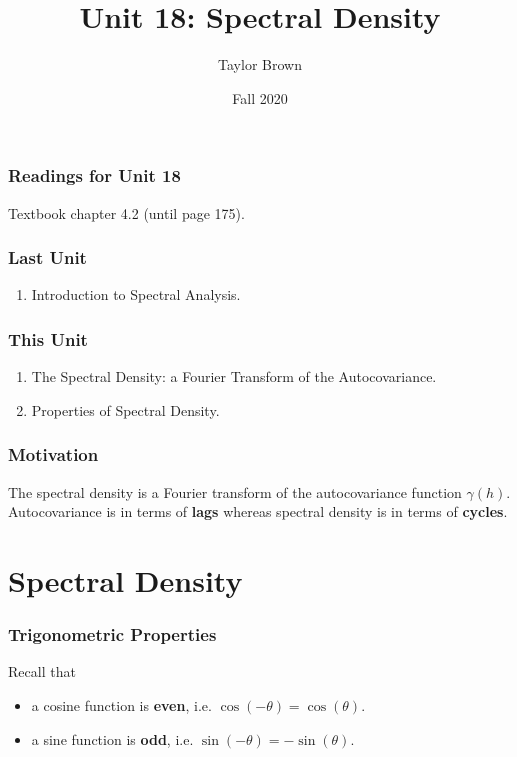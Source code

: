 \documentclass[%
xcolor=pdftex]{beamer}
\title{Unit 18: Spectral Density}
\author[STAT 5170: Applied Time Series, Unit 18]{Taylor Brown}
\institute{Department of Statistics, University of Virginia}
\date{Fall 2020} %
\begin{document}
\frame{\titlepage}


\begin{frame}
\frametitle{Readings for Unit 18}

Textbook chapter 4.2 (until page 175).

\end{frame}



\begin{frame}
\frametitle{Last Unit}
\begin{enumerate}
\item Introduction to Spectral Analysis.
\end{enumerate}
\end{frame}

\begin{frame}
\frametitle{This Unit}
\begin{enumerate}
\item The Spectral Density: a Fourier Transform of the Autocovariance.
\item Properties of Spectral Density.
\end{enumerate}
\end{frame}

\begin{frame}
\frametitle{Motivation}

The spectral density is a Fourier transform of the autocovariance function $\gamma(h)$. Autocovariance is in terms of \textbf{lags} whereas spectral density is in terms of \textbf{cycles}.

\end{frame}

\section{Spectral Density}
\frame{\tableofcontents[currentsection]}



% 
% 



\begin{frame}
\frametitle{Trigonometric Properties}

Recall that

\begin{itemize}
\item a cosine function is \textbf{even}, i.e. $\cos(-\theta) = \cos(\theta)$.
\item a sine function is \textbf{odd}, i.e. $\sin(-\theta) = -\sin(\theta)$.
\end{itemize}

\end{frame}
\end{document}
